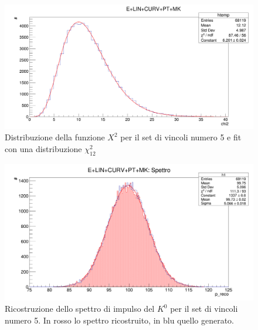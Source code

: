 \documentclass[8pt]{extarticle}
\begin{document}
\begin{figure}
	\begin{center}
		\includegraphics[scale=0.25]{set_5_chi2} 
		\caption{Distribuzione della funzione $X^2$ per il set di vincoli numero 5 e fit con una distribuzione $\chi^2_{12}$}
		\label{fig:set_5_chi2}
	\end{center}
\end{figure}

\begin{figure}
	\begin{center}
		\includegraphics[scale=0.25]{set_5_spettro} 
		\caption{Ricostruzione dello spettro di impulso del $K^0$ per il set di vincoli numero 5. In rosso lo spettro ricostruito, in blu quello generato.}
		\label{fig:set_5_spettro}
	\end{center}
\end{figure}
\end{document}
